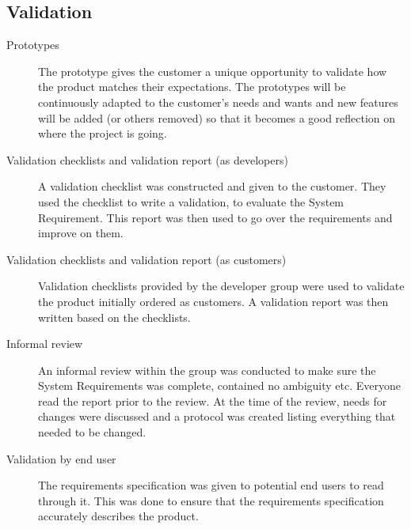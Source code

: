 \documentclass[10pt,a4paper]{article}
\begin{document}
\subsection{Validation}
\begin{description}
\item[Prototypes] The prototype gives the customer a unique opportunity to validate how the product matches their expectations. The prototypes will be continuously adapted to the customer's needs and wants and new features will be added (or others removed) so that it becomes a good reflection on where the project is going. 

\item[Validation checklists and validation report (as developers)] A validation checklist was constructed and given to the customer. They used the checklist to write a validation, to evaluate the System Requirement. This report was then used to go over the requirements and improve on them.

\item[Validation checklists and validation report (as customers)] Validation checklists provided by the developer group were used to validate the product initially ordered as customers. A validation report was then written based on the checklists.

\item[Informal review] An informal review within the group was conducted to make sure the System Requirements was complete, contained no ambiguity etc. Everyone read the report prior to the review. At the time of the review, needs for changes were discussed and a protocol was created listing everything that needed to be changed.

\item[Validation by end user] The requirements specification was given to potential end users to read through it. This was done to ensure that the requirements specification accurately describes the product.

\end{description}


\end{document}
